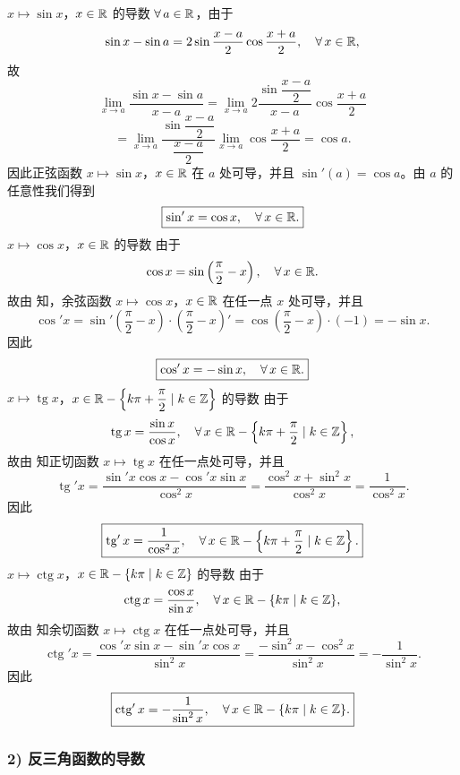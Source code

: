 \(x\longmapsto\sin x\)，\(x\in\mathbb{R}\) 的导数 \(\forall\,a\in\mathbb{R}\)，由于
\[
\sin x-\sin a=2\sin\frac{x-a}{2}\cos\frac{x+a}{2},\quad\forall\,x\in\mathbb{R},
\]
故
\[
\lim_{x\to a}\frac{\sin x-\sin a}{x-a}=\lim_{x\to a}2\frac{\sin\dfrac{x-a}{2}}{x-a}\cos\frac{x+a}{2}
\]
\[
=\lim_{x\to a}\frac{\sin\dfrac{x-a}{2}}{\dfrac{x-a}{2}}\lim_{x\to a}\cos\frac{x+a}{2}=\cos a.
\]
因此正弦函数 \(x\longmapsto\sin x\)，\(x\in\mathbb{R}\) 在 \(a\) 处可导，并且 \(\sin'(a)=\cos a\)。由 \(a\) 的任意性我们得到
\[
\boxed{\sin'x=\cos x,\quad\forall\,x\in\mathbb{R}.}
\]
\(x\longmapsto\cos x\)，\(x\in\mathbb{R}\) 的导数 由于
\[
\cos x=\sin\left(\frac\pi2-x\right),\quad\forall\,x\in\mathbb{R}.
\]
故由 知，余弦函数 \(x\longmapsto\cos x\)，\(x\in\mathbb{R}\) 在任一点 \(x\) 处可导，并且
\[
\cos'x=\sin'\left(\frac\pi2-x\right)\cdot\left(\frac\pi2-x\right)'=\cos\left(\frac\pi2-x\right)\cdot(-1)=-\sin x.
\]
因此
\[
\boxed{\cos'x=-\sin x,\quad\forall\,x\in\mathbb{R}.}
\]
\(x\longmapsto\operatorname{tg}x\)，\(x\in\mathbb{R}-\left\{k\pi+\dfrac\pi2 \mid k\in\mathbb{Z}\right\}\) 的导数 由于
\[
\operatorname{tg}x=\frac{\sin x}{\cos x},\quad\forall\,x\in\mathbb{R}-\left\{k\pi+\frac\pi2 \mid k\in\mathbb{Z}\right\},
\]
故由 知正切函数 \(x\longmapsto\operatorname{tg}x\) 在任一点处可导，并且
\[
\operatorname{tg}'x=\frac{\sin'x\cos x-\cos'x\sin x}{\cos^2x}=\frac{\cos^2x+\sin^2x}{\cos^2x}=\frac1{\cos^2x}.
\]
因此
\[
\boxed{\operatorname{tg}'x=\frac1{\cos^2x},\quad\forall\,x\in\mathbb{R}-\left\{k\pi+\frac\pi2 \mid k\in\mathbb{Z}\right\}.}
\]
\(x\longmapsto\operatorname{ctg}x\)，\(x\in\mathbb{R}-\{k\pi\mid k\in\mathbb{Z}\}\) 的导数 由于
\[
\operatorname{ctg}x=\frac{\cos x}{\sin x},\quad\forall\,x\in\mathbb{R}-\{k\pi\mid k\in\mathbb{Z}\},
\]
故由 知余切函数 \(x\longmapsto\operatorname{ctg}x\) 在任一点处可导，并且
\[
\operatorname{ctg}'x=\frac{\cos'x\sin x-\sin'x\cos x}{\sin^2x}=\frac{-\sin^2x-\cos^2x}{\sin^2x}=-\frac1{\sin^2x}.
\]
因此
\[
\boxed{\operatorname{ctg}'x=-\frac1{\sin^2x},\quad\forall\,x\in\mathbb{R}-\{k\pi\mid k\in\mathbb{Z}\}.}
\]

\subsubsection*{2) 反三角函数的导数}

